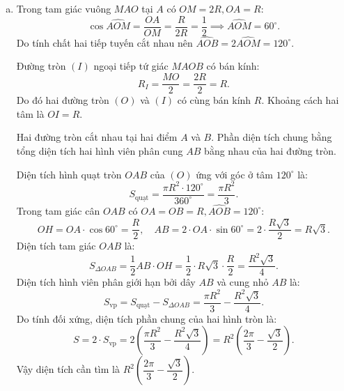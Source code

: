 \begin{bt}
{\begin{enumerate}[a)]
			Mặt khác, $\widehat{ABC} = 90^\circ$ (góc nội tiếp chắn nửa đường tròn đường kính $AC$), suy ra $BC \perp AB$.
			
			Do đó $OM \parallel BC$ (vì cùng vuông góc với $AB$).
			
			Vì $H$ là trung điểm của $AB$ nên $AB = 2AH$.
			
			Vì $AC$ là đường kính nên $AC = 2AO$.
			
			Xét $\Delta MAO$ và $\Delta AHO$ có:
			$$\widehat{AOM}\text{ chung},\quad \widehat{MAO} = \widehat{AHO} = 90^\circ.$$
			Do đó $\Delta MAO \backsim \Delta AHO\text{ (g-g)}$, suy ra:
			$$\dfrac{MA}{AH} = \dfrac{MO}{AO} \implies MA \cdot AO = MO \cdot AH \implies MA \cdot (2AO) = MO \cdot (2AH) \implies AM \cdot AC = OM \cdot AB.$$
			\item Trong tam giác vuông $MAO$ tại $A$ có $OM = 2R, OA = R$:
			$$\cos\widehat{AOM} = \dfrac{OA}{OM} = \dfrac{R}{2R} = \dfrac{1}{2} \implies \widehat{AOM} = 60^\circ.$$
			Do tính chất hai tiếp tuyến cắt nhau nên $\widehat{AOB} = 2\widehat{AOM} = 120^\circ$.
			
			Đường tròn $(I)$ ngoại tiếp tứ giác $MAOB$ có bán kính:
			$$R_I = \dfrac{MO}{2} = \dfrac{2R}{2} = R.$$
			Do đó hai đường tròn $(O)$ và $(I)$ có cùng bán kính $R$. Khoảng cách hai tâm là $OI = R$.
			
			Hai đường tròn cắt nhau tại hai điểm $A$ và $B$. Phần diện tích chung bằng tổng diện tích hai hình viên phân cung $AB$ bằng nhau của hai đường tròn.
			
			Diện tích hình quạt tròn $OAB$ của $(O)$ ứng với góc ở tâm $120^\circ$ là:
			$$S_{\text{quạt}} = \dfrac{\pi R^2 \cdot 120^\circ}{360^\circ} = \dfrac{\pi R^2}{3}.$$
			Trong tam giác cân $OAB$ có $OA = OB = R, \widehat{AOB} = 120^\circ$:
			$$OH = OA \cdot \cos 60^\circ = \dfrac{R}{2},\quad AB = 2 \cdot OA \cdot \sin 60^\circ = 2 \cdot \dfrac{R\sqrt{3}}{2} = R\sqrt{3}.$$
			Diện tích tam giác $OAB$ là:
			$$S_{\Delta OAB} = \dfrac{1}{2} AB \cdot OH = \dfrac{1}{2} \cdot R\sqrt{3} \cdot \dfrac{R}{2} = \dfrac{R^2\sqrt{3}}{4}.$$
			Diện tích hình viên phân giới hạn bởi dây $AB$ và cung nhỏ $AB$ là:
			$$S_{\text{vp}} = S_{\text{quạt}} - S_{\Delta OAB} = \dfrac{\pi R^2}{3} - \dfrac{R^2\sqrt{3}}{4}.$$
			Do tính đối xứng, diện tích phần chung của hai hình tròn là:
			$$S = 2 \cdot S_{\text{vp}} = 2\left(\dfrac{\pi R^2}{3} - \dfrac{R^2\sqrt{3}}{4}\right) = R^2\left(\dfrac{2\pi}{3} - \dfrac{\sqrt{3}}{2}\right).$$
			Vậy diện tích cần tìm là $R^2\left(\dfrac{2\pi}{3} - \dfrac{\sqrt{3}}{2}\right)$.
		\end{enumerate}
}
\end{bt}


